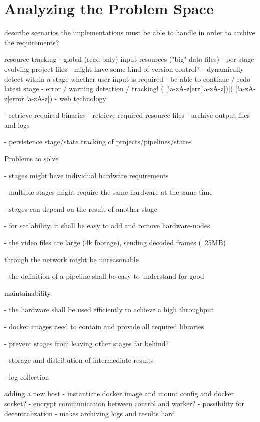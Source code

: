 \section{Analyzing the Problem Space}

describe scenarios the implementations must be able to handle in order to archive the requirements?

resource tracking
 - global (read-only) input resources ("big" data files)
 - per stage evolving project files
   - might have some kind of version control?
 - dynamically detect within a stage whether user input is required
 - be able to continue / redo latest stage
 - error / warning detection / tracking!
   ( [!a-zA-z]err[!a-zA-z])|( [!a-zA-z]error[!a-zA-z])
 - web technology

- retrieve required binaries
- retrieve required resource files
- archive output files and logs

- persistence stage/state tracking of projects/pipelines/states

Problems to solve



- stages might have individual hardware requirements

- multiple stages might require the same hardware at the same time

- stages can depend on the result of another stage

- for scalability, it shall be easy to add and remove hardware-nodes

- the video files are large (4k footage), sending decoded frames (~25MB)

through the network might be unreasonable

- the definition of a pipeline shall be easy to understand for good

maintainability

- the hardware shall be used efficiently to achieve a high throughput

- docker images need to contain and provide all required libraries

- prevent stages from leaving other stages far behind?

- storage and distribution of intermediate results

- log collection




adding a new host
 - instantiate docker image and mount config and docker socket?
 - encrypt communication between control and worker?
 - possibility for decentralization
    - makes archiving logs and results hard


